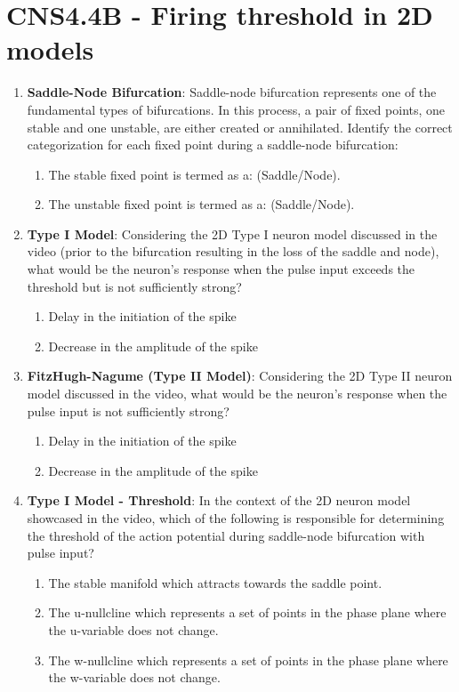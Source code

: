 \documentclass[11pt,letterpaper]{article}
\begin{document}
\section{CNS4.4B - Firing threshold in 2D models}
\begin{enumerate}
    \item \textbf{Saddle-Node Bifurcation}: Saddle-node bifurcation represents one of the fundamental types of bifurcations. In this process, a pair of fixed points, one stable and one unstable, are either created or annihilated. Identify the correct categorization for each fixed point during a saddle-node bifurcation:

    \begin{enumerate}
    \item The stable fixed point is termed as a: (Saddle/Node).
    \item The unstable fixed point is termed as a: (Saddle/Node).
    \end{enumerate}

    \item \textbf{Type I Model}: Considering the 2D Type I neuron model discussed in the video (prior to the bifurcation resulting in the loss of the saddle and node), what would be the neuron's response when the pulse input exceeds the threshold but is not sufficiently strong?
    \begin{enumerate}
        \item Delay in the initiation of the spike
        \item Decrease in the amplitude of the spike
    \end{enumerate}

    \item \textbf{FitzHugh-Nagume (Type II Model)}: Considering the 2D Type II neuron model discussed in the video, what would be the neuron's response when the pulse input is not sufficiently strong?
    \begin{enumerate}
        \item Delay in the initiation of the spike
        \item Decrease in the amplitude of the spike
    \end{enumerate}

    \item \textbf{Type I Model - Threshold}: In the context of the 2D neuron model showcased in the video, which of the following is responsible for determining the threshold of the action potential during saddle-node bifurcation with pulse input?
    \begin{enumerate}
        \item The stable manifold which attracts towards the saddle point.
        \item The u-nullcline which represents a set of points in the phase plane where the u-variable does not change.
        \item The w-nullcline which represents a set of points in the phase plane where the w-variable does not change.
    \end{enumerate}


\end{enumerate}
\end{document}
